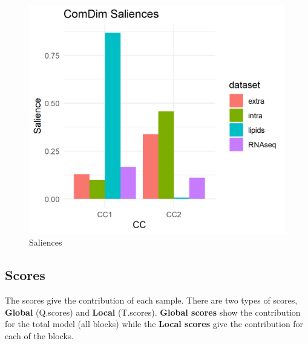 \documentclass[
]{book}
\begin{document}
\begin{figure}

{\centering \includegraphics[width=0.5\linewidth]{Figs/fig1} 

}

\caption{Saliences}\label{fig:unnamed-chunk-8}
\end{figure}

\hypertarget{scores}{%
\subsection{Scores}\label{scores}}

The scores give the contribution of each sample. There are two types of scores,
\textbf{Global} (Q.scores) and \textbf{Local} (T.scores). \textbf{Global scores} show the
contribution for the total model (all blocks) while the \textbf{Local scores} give
the contribution for each of the blocks.
\end{document}
